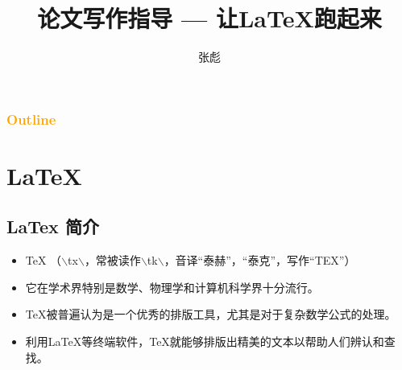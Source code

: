 \documentclass[13pt]{ctexbeamer}
\begin{document}
\title[让LaTeX跑起来]{论文写作指导  ---  让LaTeX跑起来}
\author[]{{\large 张彪} }

\date{}


%



\begin{frame}
\maketitle
\end{frame}


\begin{frame}
	\frametitle{\textcolor{orange}{Outline}}
	\tableofcontents
\end{frame}




\section{LaTeX}

\subsection{LaTex 简介}
\begin{frame}
	\begin{itemize}
	\item 	TeX
（$\backslash$t\textepsilon x$\backslash$，常被读作$\backslash$t\textepsilon k$\backslash$，音译“泰赫”，“泰克”，写作“TEX”）

\item 它在学术界特别是数学、物理学和计算机科学界十分流行。
	\item
TeX被普遍认为是一个优秀的排版工具，尤其是对于复杂数学公式的处理。
	\item
利用LaTeX等终端软件，TeX就能够排版出精美的文本以帮助人们辨认和查找。
\end{itemize}
\end{frame}
\end{document}
